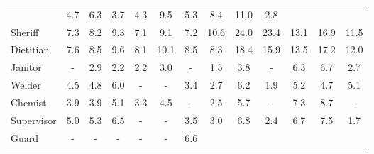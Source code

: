 \begin{table*}[p]
{\begin{tabular}{l|ccc|ccc|ccc|ccc}
& \cellcolor{orange2} 4.7 & \cellcolor{orange2} 6.3 & \cellcolor{orange1} 3.7
& \cellcolor{orange2} 4.3 & \cellcolor{orange4} 9.5 & \cellcolor{orange2} 5.3
& \cellcolor{orange3} 8.4 & \cellcolor{orange4} 11.0 & \cellcolor{orange1} 2.8
\\
Sheriff
& \cellcolor{orange3} 7.3 & \cellcolor{orange3} 8.2 & \cellcolor{orange4} 9.3
& \cellcolor{orange3} 7.1 & \cellcolor{orange3} 9.1 & \cellcolor{orange3} 7.2
& \cellcolor{orange4} 10.6 & \cellcolor{orange9} 24.0 & \cellcolor{orange9} 23.4
& \cellcolor{orange5} 13.1 & \cellcolor{orange6} 16.9 & \cellcolor{orange4} 11.5
\\
Dietitian
& \cellcolor{orange3} 7.6 & \cellcolor{orange3} 8.5 & \cellcolor{orange4} 9.6
& \cellcolor{orange3} 8.1 & \cellcolor{orange4} 10.1 & \cellcolor{orange3} 8.5
& \cellcolor{orange3} 8.3 & \cellcolor{orange7} 18.4 & \cellcolor{orange6} 15.9
& \cellcolor{orange5} 13.5 & \cellcolor{orange7} 17.2 & \cellcolor{orange5} 12.0
\\
Janitor
& \cellcolor{lightgray} - & \cellcolor{blue1} 2.9 & \cellcolor{blue1} 2.2
& \cellcolor{orange1} 2.2 & \cellcolor{orange1} 3.0 & \cellcolor{lightgray} -
& \cellcolor{orange1} 1.5 & \cellcolor{orange1} 3.8 & \cellcolor{lightgray} -
& \cellcolor{orange2} 6.3 & \cellcolor{orange3} 6.7 & \cellcolor{blue1} 2.7
\\
Welder
& \cellcolor{orange2} 4.5 & \cellcolor{orange2} 4.8 & \cellcolor{orange2} 6.0
& \cellcolor{lightgray} - & \cellcolor{lightgray} - & \cellcolor{blue1} 3.4
& \cellcolor{orange1} 2.7 & \cellcolor{orange2} 6.2 & \cellcolor{orange1} 1.9
& \cellcolor{orange2} 5.2 & \cellcolor{orange2} 4.7 & \cellcolor{blue2} 5.1
\\
Chemist
& \cellcolor{orange2} 3.9 & \cellcolor{orange2} 3.9 & \cellcolor{orange2} 5.1
& \cellcolor{orange1} 3.3 & \cellcolor{orange2} 4.5 & \cellcolor{lightgray} -
& \cellcolor{orange1} 2.5 & \cellcolor{orange2} 5.7 & \cellcolor{lightgray} -
& \cellcolor{orange3} 7.3 & \cellcolor{orange3} 8.7 & \cellcolor{lightgray} -
\\
Supervisor
& \cellcolor{orange2} 5.0 & \cellcolor{orange2} 5.3 & \cellcolor{orange2} 6.5
& \cellcolor{lightgray} - & \cellcolor{lightgray} - & \cellcolor{blue1} 3.5
& \cellcolor{orange1} 3.0 & \cellcolor{orange3} 6.8 & \cellcolor{orange1} 2.4
& \cellcolor{orange3} 6.7 & \cellcolor{orange3} 7.5 & \cellcolor{blue1} 1.7
\\
Guard
& \cellcolor{lightgray} - & \cellcolor{lightgray} - & \cellcolor{lightgray} -
& \cellcolor{lightgray} - & \cellcolor{lightgray} - & \cellcolor{blue3} 6.6

\end{tabular}}
\end{table*}
